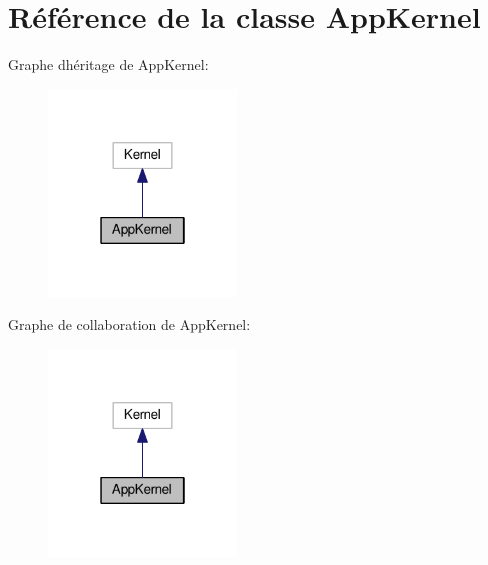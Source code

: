 \hypertarget{classAppKernel}{}\section{Référence de la classe App\+Kernel}
\label{classAppKernel}


Graphe d\textquotesingle{}héritage de App\+Kernel\+:\nopagebreak
\begin{figure}[H]
\begin{center}
\leavevmode
\includegraphics[width=142pt]{classAppKernel__inherit__graph}
\end{center}
\end{figure}


Graphe de collaboration de App\+Kernel\+:\nopagebreak
\begin{figure}[H]
\begin{center}
\leavevmode
\includegraphics[width=142pt]{classAppKernel__coll__graph}
\end{center}
\end{figure}
